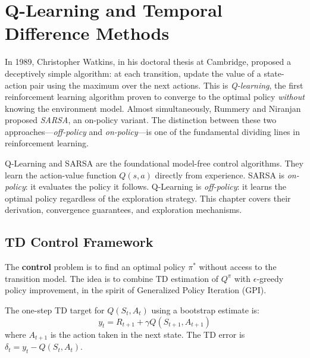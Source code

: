 \chapter{Q-Learning and Temporal Difference Methods}
\label{ch:q_learning}

In 1989, Christopher Watkins, in his doctoral thesis at Cambridge, proposed a deceptively simple algorithm: at each transition, update the value of a state-action pair using the maximum over the next actions. This is \emph{Q-learning}, the first reinforcement learning algorithm proven to converge to the optimal policy \emph{without} knowing the environment model. Almost simultaneously, Rummery and Niranjan proposed \emph{SARSA}, an on-policy variant. The distinction between these two approaches---\emph{off-policy} and \emph{on-policy}---is one of the fundamental dividing lines in reinforcement learning.

\begin{intuition}
Q-Learning and SARSA are the foundational model-free control algorithms.
They learn the action-value function $Q(s,a)$ directly from experience.
SARSA is \emph{on-policy}: it evaluates the policy it follows.
Q-Learning is \emph{off-policy}: it learns the optimal policy regardless
of the exploration strategy. This chapter covers their derivation,
convergence guarantees, and exploration mechanisms.
\end{intuition}

\section{TD Control Framework}
\label{sec:td_control}

The \textbf{control} problem is to find an optimal
policy $\pi^*$ without access to the transition model. The idea is to
combine TD estimation of $Q^\pi$ with $\epsilon$-greedy policy improvement,
in the spirit of Generalized Policy Iteration (GPI).

\begin{definition}
The one-step TD target for $Q(S_t, A_t)$ using a bootstrap estimate is:
\[
    y_t = R_{t+1} + \gamma Q(S_{t+1}, A_{t+1})
\]
where $A_{t+1}$ is the action taken in the next state. The TD error is
$\delta_t = y_t - Q(S_t, A_t)$.
\end{definition}

